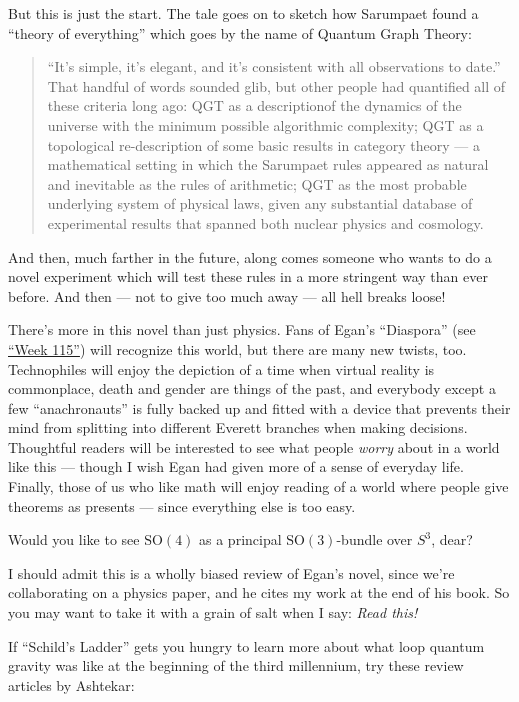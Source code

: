 \documentclass{article}
\begin{document}
But this is just the start. The tale goes on to sketch how Sarumpaet
found a ``theory of everything'' which goes by the name of Quantum Graph
Theory:

\begin{quote}
``It's simple, it's elegant, and it's consistent with all observations
to date.'' That handful of words sounded glib, but other people had
quantified all of these criteria long ago: QGT as a descriptionof the
dynamics of the universe with the minimum possible algorithmic
complexity; QGT as a topological re-description of some basic results in
category theory --- a mathematical setting in which the Sarumpaet rules
appeared as natural and inevitable as the rules of arithmetic; QGT as
the most probable underlying system of physical laws, given any
substantial database of experimental results that spanned both nuclear
physics and cosmology.
\end{quote}

And then, much farther in the future, along comes someone who wants to
do a novel experiment which will test these rules in a more stringent
way than ever before. And then --- not to give too much away --- all
hell breaks loose!

There's more in this novel than just physics. Fans of Egan's
``Diaspora'' (see \protect\hyperlink{week115}{``Week 115''}) will
recognize this world, but there are many new twists, too. Technophiles
will enjoy the depiction of a time when virtual reality is commonplace,
death and gender are things of the past, and everybody except a few
``anachronauts'' is fully backed up and fitted with a device that
prevents their mind from splitting into different Everett branches when
making decisions. Thoughtful readers will be interested to see what
people \emph{worry} about in a world like this --- though I wish Egan
had given more of a sense of everyday life. Finally, those of us who
like math will enjoy reading of a world where people give theorems as
presents --- since everything else is too easy.

Would you like to see \(\mathrm{SO}(4)\) as a principal
\(\mathrm{SO}(3)\)-bundle over \(S^3\), dear?

I should admit this is a wholly biased review of Egan's novel, since
we're collaborating on a physics paper, and he cites my work at the end
of his book. So you may want to take it with a grain of salt when I say:
\emph{Read this!}

If ``Schild's Ladder'' gets you hungry to learn more about what loop
quantum gravity was like at the beginning of the third millennium, try
these review articles by Ashtekar:
\end{document}
